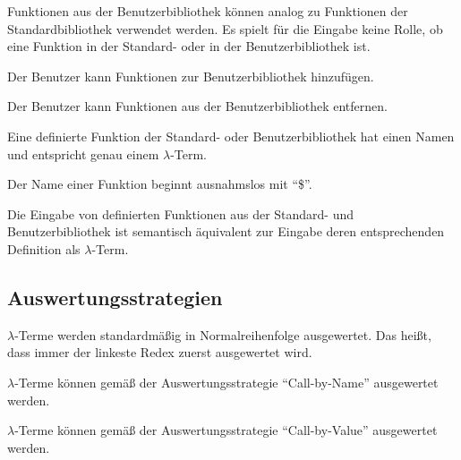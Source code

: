 \documentclass[parskip=full,11pt,twoside]{scrartcl}
\begin{document}
Funktionen aus der Benutzerbibliothek können analog zu Funktionen der Standardbibliothek verwendet werden. Es spielt für die Eingabe keine Rolle, ob eine Funktion in der Standard- oder in der Benutzerbibliothek ist.

Der Benutzer kann Funktionen zur Benutzerbibliothek hinzufügen.

Der Benutzer kann Funktionen aus der Benutzerbibliothek entfernen.

Eine definierte Funktion der Standard- oder Benutzerbibliothek hat einen Namen und entspricht genau einem $\lambda$-Term.

Der Name einer Funktion beginnt ausnahmslos mit \enquote{\$}.

Die Eingabe von definierten Funktionen aus der Standard- und Benutzerbibliothek ist semantisch äquivalent zur Eingabe deren entsprechenden Definition als $\lambda$-Term.









\subsection{Auswertungsstrategien}

$\lambda$-Terme werden standardmäßig in Normalreihenfolge ausgewertet. Das heißt, dass immer der linkeste Redex zuerst ausgewertet wird.

$\lambda$-Terme können gemäß der Auswertungsstrategie \enquote{Call-by-Name} ausgewertet werden.

$\lambda$-Terme können gemäß der Auswertungsstrategie \enquote{Call-by-Value} ausgewertet werden.
\end{document}
